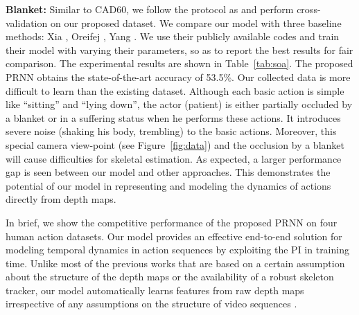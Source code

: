 \documentclass[10pt,twocolumn,letterpaper]{article}
\begin{document}
\noindent \textbf{Blanket:} Similar to CAD60, we follow the protocol as \cite{Jiang_tpami_2014} and perform cross-validation on our proposed dataset. We compare our model with three baseline methods:  Xia \etal \cite{Lu_cvpr_2013}, Oreifej \etal \cite{Omar_cvpr_2013}, Yang \etal \cite{Yang_tpami_2016}. We use their publicly available codes and train their model with varying their parameters, so as to report the best results for fair comparison. The experimental results are shown in Table~\ref{tab:soa}. The proposed PRNN obtains the state-of-the-art accuracy of 53.5\%. Our collected data is more difficult to learn than the existing dataset. Although each basic action is simple like ``sitting'' and ``lying down'', the actor (\ie patient) is either partially occluded by a blanket or in a suffering status when he performs these actions. It introduces severe noise (\eg shaking his body, trembling) to the basic actions. Moreover, this special camera view-point (see Figure~\ref{fig:data}) and the occlusion by a blanket will cause difficulties for skeletal estimation. As expected, a larger performance gap is seen between our model and other approaches. This demonstrates the potential of our model in representing and modeling the dynamics of actions directly from depth maps. 

In brief, we show the competitive performance of the proposed PRNN on four human action datasets. Our model provides an effective end-to-end solution for modeling temporal dynamics in action sequences by exploiting the PI in training time. Unlike most of the previous works that are based on a certain assumption about the structure of the depth maps or the availability of a robust skeleton tracker, our model automatically learns features from raw depth maps irrespective of any assumptions \cite{Yu_bmvc_2010,Wong_cvpr_2007} on the structure of video sequences .
\end{document}
